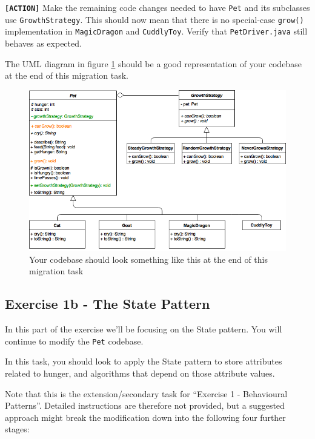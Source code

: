 \documentclass[
]{book}
\begin{document}
\textbf{\texttt{{[}ACTION{]}}} Make the remaining code changes needed to have \texttt{Pet} and its subclasses use \texttt{GrowthStrategy}. This should now mean that there is no special-case \texttt{grow()} implementation in \texttt{MagicDragon} and \texttt{CuddlyToy}. Verify that \texttt{PetDriver.java} still behaves as expected.

The UML diagram in figure \ref{fig:petstrategy-fig} should be a good representation of your codebase at the end of this migration task.

\begin{figure}

{\centering \includegraphics[width=1\linewidth]{images/GrowthStrategy} 

}

\caption{Your codebase should look something like this at the end of this migration task}\label{fig:petstrategy-fig}
\end{figure}

\hypertarget{state}{%
\subsection{Exercise 1b - The State Pattern}\label{state}}

In this part of the exercise we'll be focusing on the State pattern. You will continue to modify the \texttt{Pet} codebase.

In this task, you should look to apply the State pattern to store attributes related to hunger, and algorithms that depend on those attribute values.

Note that this is the extension/secondary task for ``Exercise 1 - Behavioural Patterns''. Detailed instructions are therefore not provided, but a suggested approach might break the modification down into the following four further stages:
\end{document}
